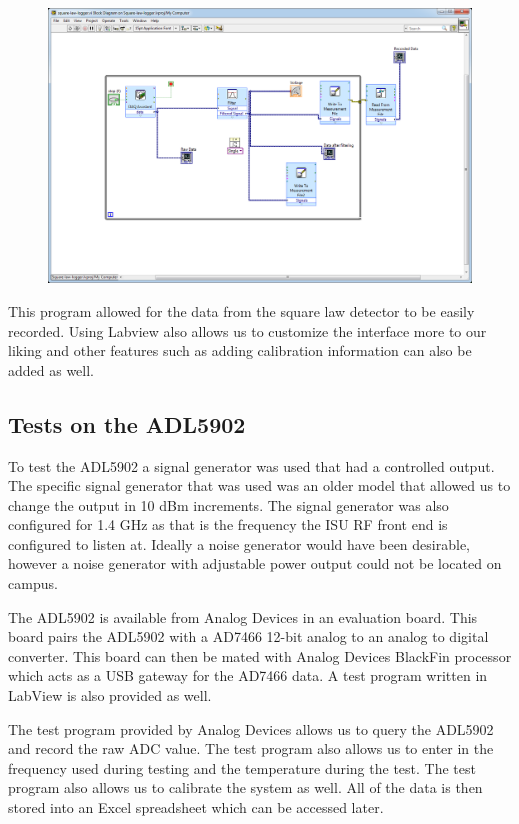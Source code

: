 {\begin{figure}[h!tb] \centering
\includegraphics[width=\textwidth]{Images/labview-diagram.png}
\label{labviewblock}
\end{figure}
}

This program allowed for the data from the square law detector to be easily recorded.  Using Labview also allows us to customize the interface more to our liking and other features such as adding calibration information can also be added as well.  

\subsection{Tests on the ADL5902}
To test the ADL5902 a signal generator was used that had a controlled output.  The specific signal generator that was used was an older model that allowed us to change the output in 10 dBm increments.  The signal generator was also configured for 1.4 GHz as that is the frequency the ISU RF front end is configured to listen at.  Ideally a noise generator would have been desirable, however a noise generator with adjustable power output could not be located on campus.  

The ADL5902 is available from Analog Devices in an evaluation board.  This board pairs the ADL5902 with a AD7466 12-bit analog to an analog to digital converter.  This board can then be mated with Analog Devices BlackFin processor which acts as a USB gateway for the AD7466 data.  A test program written in LabView is also provided as well.

The test program provided by Analog Devices allows us to query the ADL5902 and record the raw ADC value.  The test program also allows us to enter in the frequency used during testing and the temperature during the test.  The test program also allows us to calibrate the system as well.  All of the data is then stored into an Excel spreadsheet which can be accessed later.

